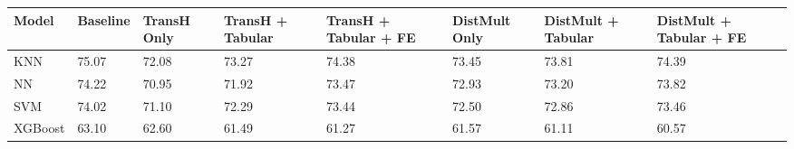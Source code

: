\begin{tabular}{llllllll}
\toprule
Model & Baseline & TransH Only & TransH + Tabular & TransH + Tabular + FE & DistMult Only & DistMult + Tabular & DistMult + Tabular + FE \\
\midrule
KNN & 75.07 & 72.08 & 73.27 & 74.38 & 73.45 & 73.81 & 74.39 \\
NN & 74.22 & 70.95 & 71.92 & 73.47 & 72.93 & 73.20 & 73.82 \\
SVM & 74.02 & 71.10 & 72.29 & 73.44 & 72.50 & 72.86 & 73.46 \\
XGBoost & 63.10 & 62.60 & 61.49 & 61.27 & 61.57 & 61.11 & 60.57 \\
\bottomrule
\end{tabular}
